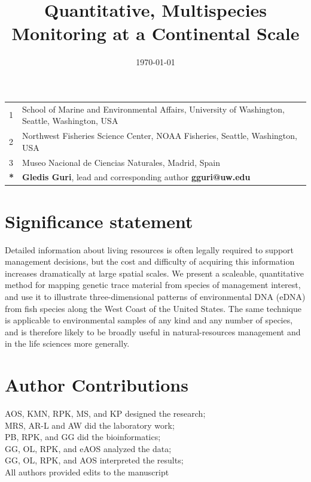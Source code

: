 \documentclass{article}
\title{Quantitative, Multispecies Monitoring at a Continental Scale}
\author{Gledis Guri$^1$\textbf{*} \and
Owen Liu$^2$ \and
Ryan P. Kelly$^1$ \and
Megan R. Shaffer$^1$\and
Kim Parsons$^2$ \and
Ana Ram\'on-Laca$^{1,2,3}$ \and
Krista M. Nichols$^2$ \and
Pedro F. P. Brandão-Dias$^1$ \and
Abigail Wells$^2$ \and
Andrew Olaf Shelton$^2$ \and}
\date{\today}
\begin{document}
\maketitle

\section*{}

\begin{center}
\begin{tabular}{ll}
1 & School of Marine and Environmental Affairs, University of Washington, Seattle, Washington, USA \\
2 & Northwest Fisheries Science Center, NOAA Fisheries, Seattle, Washington, USA \\
3 & Museo Nacional de Ciencias Naturales, Madrid, Spain \\
\hline
\textbf{*} & \textbf{Gledis Guri}, lead and corresponding author \textbf{gguri@uw.edu}
\end{tabular}
\end{center}

\section*{Significance statement}
Detailed information about living resources is often legally required to support management decisions, but the cost and difficulty of acquiring this information increases dramatically at large spatial scales. We present a scaleable, quantitative method for mapping genetic trace material from species of management interest, and use it to illustrate three-dimensional patterns of environmental DNA (eDNA) from fish species along the West Coast of the United States. The same technique is applicable to environmental samples of any kind and any number of species, and is therefore likely to be broadly useful in natural-resources management and in the life sciences more generally.

\section*{Author Contributions}
AOS, KMN, RPK, MS, and KP designed the research;\\
MRS, AR-L and AW did the laboratory work; \\
PB, RPK, and GG did the bioinformatics;\\
GG, OL, RPK, and eAOS analyzed the data;\\
GG, OL, RPK, and AOS interpreted the results;\\
All authors provided edits to the manuscript
\end{document}
